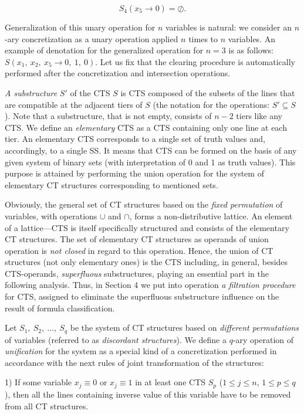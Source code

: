 \documentclass[12pt, a4paper]{article}
\begin{document}
\smallskip
$$S_4(x_5 \to 0)=\oslash .$$

Generalization of this unary operation for $n$ variables is natural: we consider an $n$-ary concretization as a unary operation applied $n$ times to $n$ variables. An example of denotation for
the generalized operation for $n=3$ is as follows: $S(x_1,\ x_2,\ x_5 \to 0,\ 1,\ 0)$.
Let us fix that the clearing procedure is automatically performed after the concretization and intersection operations.

{\it A substructure} $S'$ of the CTS $S$ is CTS composed of the subsets of the lines that are compatible at the adjacent tiers of $S$ (the notation for the operations: $S' \subseteq S$).
Note that a substructure, that is not empty, consists of $n-2$ tiers like any CTS.
   We define an {\it elementary} CTS as a CTS containing only one line at each tier. An elementary CTS corresponds to a single set of truth values and, accordingly, to a single SS. It means that CTS can be formed on the basis of any given system of binary sets (with interpretation of  0 and 1 as truth values). This purpose is attained by performing the union operation for the system of elementary CT structures corresponding to mentioned  sets.

Obviously, the general set of CT structures based on the {\it fixed permutation} of variables, with operations $\cup$ and $\cap$, forms a non-distributive lattice. An element of a  lattice---CTS is itself specifically structured and consists of the elementary CT structures. The set of elementary CT structures as operands of union operation is {\it not closed} in regard to this operation. Hence, the union of CT structures (not only elementary ones) is the CTS including, in general, besides CTS-operands, {\it superfluous} substructures, playing an essential part in the following analysis. Thus, in Section 4 we put into operation {\it a filtration procedure} for CTS, assigned to eliminate the superfluous substructure influence on the result of formula classification.

Let $S_1,\ S_2,\ \ldots ,\ S_q$ be the system of CT structures based on {\it different permutations} of variables (referred to as {\it discordant structures}). We define a $q$-ary operation of {\it unification} for the system as a special kind of a concretization performed in accordance with the next rules of joint transformation of the structures:

\hangindent=1.1cm
1)  If some variable $x_j\equiv 0$ or $x_j\equiv 1$ in at least one CTS $S_p$ ($1\le j\le n$, $1\le p\le q$), then all the lines containing inverse value of this variable have to be removed from all CT structures.
\end{document}
